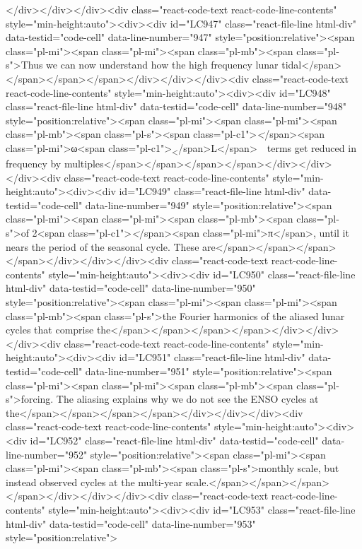 {{{{{{{{{</div></div></div><div class="react-code-text react-code-line-contents" style="min-height:auto"><div><div id="LC947" class="react-file-line html-div" data-testid="code-cell" data-line-number="947" style="position:relative"><span class="pl-mi"><span class="pl-mi"><span class="pl-mb"><span class="pl-s">Thus we can now understand how the high frequency lunar tidal</span></span></span></span></div></div></div><div class="react-code-text react-code-line-contents" style="min-height:auto"><div><div id="LC948" class="react-file-line html-div" data-testid="code-cell" data-line-number="948" style="position:relative"><span class="pl-mi"><span class="pl-mi"><span class="pl-mb"><span class="pl-s"><span class="pl-c1">\emph</span>{<span class="pl-mi">ω<span class="pl-c1">\textsubscript</span>{L}</span>}~~terms get reduced in frequency by multiples</span></span></span></span></div></div></div><div class="react-code-text react-code-line-contents" style="min-height:auto"><div><div id="LC949" class="react-file-line html-div" data-testid="code-cell" data-line-number="949" style="position:relative"><span class="pl-mi"><span class="pl-mi"><span class="pl-mb"><span class="pl-s">of 2<span class="pl-c1">\emph</span>{<span class="pl-mi">π</span>}, until it nears the period of the seasonal cycle. These are</span></span></span></span></div></div></div><div class="react-code-text react-code-line-contents" style="min-height:auto"><div><div id="LC950" class="react-file-line html-div" data-testid="code-cell" data-line-number="950" style="position:relative"><span class="pl-mi"><span class="pl-mi"><span class="pl-mb"><span class="pl-s">the Fourier harmonics of the aliased lunar cycles that comprise the</span></span></span></span></div></div></div><div class="react-code-text react-code-line-contents" style="min-height:auto"><div><div id="LC951" class="react-file-line html-div" data-testid="code-cell" data-line-number="951" style="position:relative"><span class="pl-mi"><span class="pl-mi"><span class="pl-mb"><span class="pl-s">forcing. The aliasing explains why we do not see the ENSO cycles at the</span></span></span></span></div></div></div><div class="react-code-text react-code-line-contents" style="min-height:auto"><div><div id="LC952" class="react-file-line html-div" data-testid="code-cell" data-line-number="952" style="position:relative"><span class="pl-mi"><span class="pl-mi"><span class="pl-mb"><span class="pl-s">monthly scale, but instead observed cycles at the multi-year scale.</span></span></span></span></div></div></div><div class="react-code-text react-code-line-contents" style="min-height:auto"><div><div id="LC953" class="react-file-line html-div" data-testid="code-cell" data-line-number="953" style="position:relative">
}}}}}}}}}
